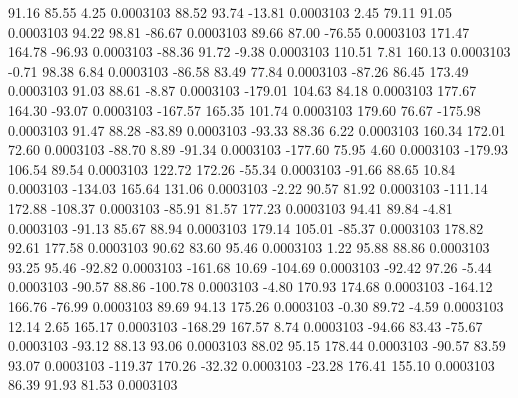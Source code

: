        91.16       85.55        4.25     0.0003103
       88.52       93.74      -13.81     0.0003103
        2.45       79.11       91.05     0.0003103
       94.22       98.81      -86.67     0.0003103
       89.66       87.00      -76.55     0.0003103
      171.47      164.78      -96.93     0.0003103
      -88.36       91.72       -9.38     0.0003103
      110.51        7.81      160.13     0.0003103
       -0.71       98.38        6.84     0.0003103
      -86.58       83.49       77.84     0.0003103
      -87.26       86.45      173.49     0.0003103
       91.03       88.61       -8.87     0.0003103
     -179.01      104.63       84.18     0.0003103
      177.67      164.30      -93.07     0.0003103
     -167.57      165.35      101.74     0.0003103
      179.60       76.67     -175.98     0.0003103
       91.47       88.28      -83.89     0.0003103
      -93.33       88.36        6.22     0.0003103
      160.34      172.01       72.60     0.0003103
      -88.70        8.89      -91.34     0.0003103
     -177.60       75.95        4.60     0.0003103
     -179.93      106.54       89.54     0.0003103
      122.72      172.26      -55.34     0.0003103
      -91.66       88.65       10.84     0.0003103
     -134.03      165.64      131.06     0.0003103
       -2.22       90.57       81.92     0.0003103
     -111.14      172.88     -108.37     0.0003103
      -85.91       81.57      177.23     0.0003103
       94.41       89.84       -4.81     0.0003103
      -91.13       85.67       88.94     0.0003103
      179.14      105.01      -85.37     0.0003103
      178.82       92.61      177.58     0.0003103
       90.62       83.60       95.46     0.0003103
        1.22       95.88       88.86     0.0003103
       93.25       95.46      -92.82     0.0003103
     -161.68       10.69     -104.69     0.0003103
      -92.42       97.26       -5.44     0.0003103
      -90.57       88.86     -100.78     0.0003103
       -4.80      170.93      174.68     0.0003103
     -164.12      166.76      -76.99     0.0003103
       89.69       94.13      175.26     0.0003103
       -0.30       89.72       -4.59     0.0003103
       12.14        2.65      165.17     0.0003103
     -168.29      167.57        8.74     0.0003103
      -94.66       83.43      -75.67     0.0003103
      -93.12       88.13       93.06     0.0003103
       88.02       95.15      178.44     0.0003103
      -90.57       83.59       93.07     0.0003103
     -119.37      170.26      -32.32     0.0003103
      -23.28      176.41      155.10     0.0003103
       86.39       91.93       81.53     0.0003103
